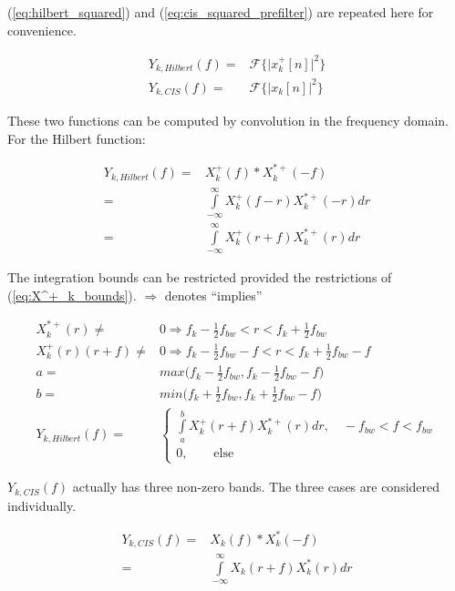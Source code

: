 \documentclass [11pt, proquest,oneside] {ganter_thesis}[2015/03/03]
\begin{document}
(\ref{eq:hilbert_squared}) and (\ref{eq:cis_squared_prefilter}) are repeated here for convenience.

\begin{align}
Y_{k,Hilbert}(f) =& \mathcal{F}\Big\{ \Big| x^+_k[n] \Big|^2  \Big\} \nonumber \\
Y_{k,CIS}(f) =& \mathcal{F}\Big\{ \Big| x_k[n] \Big|^2  \Big\} \nonumber
\end{align}

These two functions can be computed by convolution in the frequency domain.  For the Hilbert function:

\begin{align}
Y_{k,Hilbert}(f) =& X^+_{k}(f) * X^{*+}_{k}(-f) \nonumber \\
=& \int\limits_{-\infty}^{\infty} X^+_{k}(f - r) X^{*+}_{k}(-r)dr \nonumber \\
=& \int\limits_{-\infty}^{\infty} X^+_{k}(r + f) X^{*+}_{k}(r)dr
\end{align}

The integration bounds can be restricted provided the restrictions of (\ref{eq:X^+_k_bounds}).  $\Rightarrow$ denotes ``implies''

\begin{align}
X^{*+}_{k}(r) \neq& 0 \Rightarrow  f_k - \frac{1}{2} f_{bw} < r < f_k + \frac{1}{2} f_{bw} \\
%
X^{+}_{k}(r)(r + f) \neq& 0 \Rightarrow  f_k - \frac{1}{2} f_{bw} - f < r < f_k + \frac{1}{2} f_{bw} - f \\
%
a =& max\Big( f_k - \frac{1}{2} f_{bw},  f_k - \frac{1}{2} f_{bw} - f\Big) \\
b =& min\Big( f_k + \frac{1}{2} f_{bw},  f_k + \frac{1}{2} f_{bw} - f\Big) \\
%
\label{eq:cis_vs_hilbert_exactly_the_same}
Y_{k,Hilbert}(f) =&\left\{
                \begin{array}{ll}
                 \int\limits_{a}^{b} X^+_{k}(r + f) X^{*+}_{k}(r)dr, \quad -f_{bw} < f < f_{bw} \\
				0, \qquad \mathrm{else}
  \end{array}
              \right.
\end{align}

$Y_{k,CIS}(f)$ actually has three non-zero bands.  The three cases are considered individually.

\begin{align}
Y_{k,CIS}(f) =& X_{k}(f) * X_{k}^*(-f) \nonumber \\
=& \int\limits_{-\infty}^{\infty} X_{k}(r + f) X_{k}^*(r)dr
\end{align}
\end{document}
